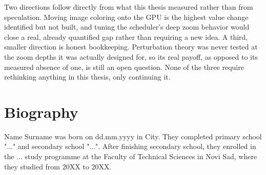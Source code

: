 \documentclass{ftndiplomski}
\begin{document}
Two directions follow directly from what this thesis measured rather
than from speculation. Moving image coloring onto the GPU is the highest
value change identified but not built, and tuning the scheduler's deep
zoom behavior would close a real, already quantified gap rather than
requiring a new idea. A third, smaller direction is honest bookkeeping.
Perturbation theory was never tested at the zoom depths it was actually
designed for, so its real payoff, as opposed to its measured absence of
one, is still an open question. None of the three require rethinking
anything in this thesis, only continuing it.




\chapter*{Biography}

Name Surname was born on dd.mm.yyyy in City. They completed primary
school "..." and secondary school "...". After finishing secondary
school, they enrolled in the ... study programme at the Faculty of
Technical Sciences in Novi Sad, where they studied from 20XX to 20XX.

\end{document}
